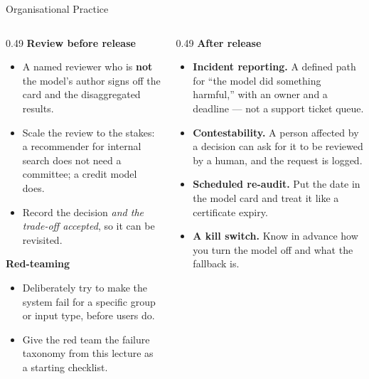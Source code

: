 \begin{frame}{Organisational Practice}

    \begin{columns}[T]
        \begin{column}{0.49\textwidth}
            \textbf{Review before release}
            \begin{itemize}\small
                \setlength\itemsep{0.3em}
                \item A named reviewer who is \textbf{not} the model's author signs off the card
                      and the disaggregated results.
                \item Scale the review to the stakes: a recommender for internal search does not
                      need a committee; a credit model does.
                \item Record the decision \emph{and the trade-off accepted}, so it can be revisited.
            \end{itemize}

            \vspace{0.7em}
            \textbf{Red-teaming}
            \begin{itemize}\small
                \setlength\itemsep{0.3em}
                \item Deliberately try to make the system fail for a specific group or input type,
                      before users do.
                \item Give the red team the failure taxonomy from this lecture as a starting
                      checklist.
            \end{itemize}
        \end{column}
        \begin{column}{0.49\textwidth}
            \textbf{After release}
            \begin{itemize}\small
                \setlength\itemsep{0.3em}
                \item \textbf{Incident reporting.} A defined path for ``the model did something
                      harmful,'' with an owner and a deadline --- not a support ticket queue.
                \item \textbf{Contestability.} A person affected by a decision can ask for it to be
                      reviewed by a human, and the request is logged.
                \item \textbf{Scheduled re-audit.} Put the date in the model card and treat it like
                      a certificate expiry.
                \item \textbf{A kill switch.} Know in advance how you turn the model off and what
                      the fallback is.
            \end{itemize}
        \end{column}
    \end{columns}


\end{frame}
